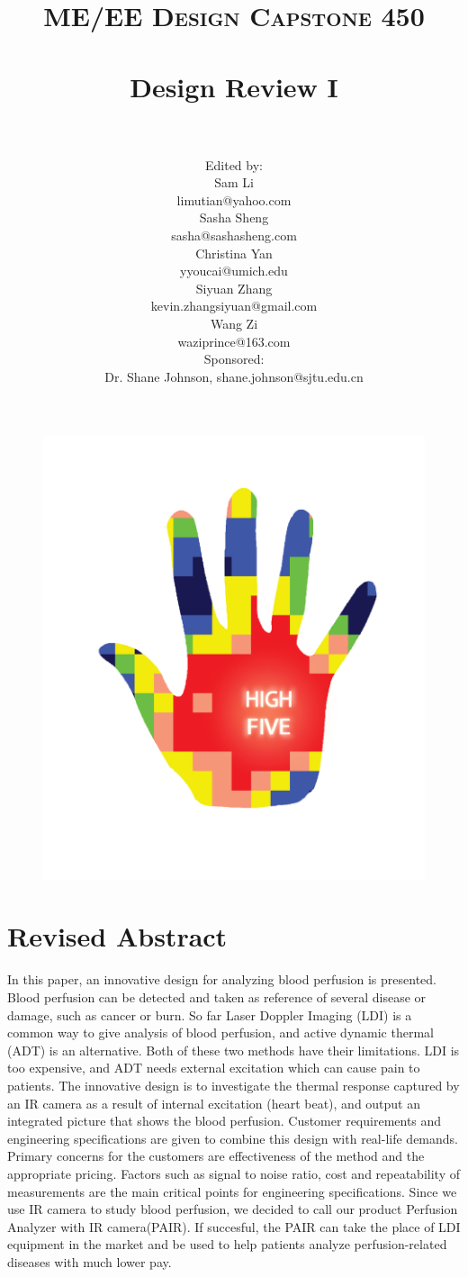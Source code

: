 \documentclass[paper=letter, fontsize=11pt]{scrartcl}
\title{
		\vspace{-1in} 	
		\usefont{OT1}{bch}{b}{n}
		\normalfont \normalsize \textsc{ME/EE Design Capstone 450} \\ [25pt]
		\horrule{0.5pt} \\[0.4cm]
		\huge Design Review I \\
		\horrule{2pt} \\[0.5cm]
}
\author{
        \normalfont 							
        \normalsize
        Edited by: \\
        Sam Li \\ limutian@yahoo.com \\[2pt]
        Sasha Sheng \\ sasha@sashasheng.com\\[2pt]
        Christina Yan \\ yyoucai@umich.edu\\[2pt]
        Siyuan Zhang\\ kevin.zhangsiyuan@gmail.com\\[2pt]
        Wang Zi \\ waziprince@163.com\\ [2pt]
         Sponsored: \\ Dr. Shane Johnson,  shane.johnson@sjtu.edu.cn\\ \vspace{0.5cm}
}
\numberwithin{equation}{section}		%
\numberwithin{figure}{section}			%
\numberwithin{table}{section}			%
\begin{document}
\maketitle
\begin{figure}[H]
    \centering
    \includegraphics[scale=0.7]{LOGO.png}
\end{figure}
\pagebreak
\tableofcontents
\pagebreak
	
\section{Revised Abstract}	
In this paper, an innovative design for analyzing blood perfusion is presented. Blood perfusion can be detected and
taken as reference of several disease or damage, such as cancer or burn. So far Laser Doppler Imaging (LDI) is a 
common way to give analysis of blood perfusion, and active dynamic thermal (ADT) is an alternative. Both of 
these two methods have their 
limitations. LDI is too expensive, and ADT needs external excitation which can cause pain to patients. The innovative design is to 
investigate the thermal response captured by an IR camera as a result of internal excitation (heart beat), and output an 
integrated picture that shows the blood perfusion. Customer requirements and engineering 
specifications are given to combine this design with real-life demands. Primary concerns for the customers are effectiveness
of the method and the appropriate pricing. Factors such as signal to noise ratio, cost and repeatability of measurements are the
main critical points for engineering specifications. Since we use IR camera to study blood perfusion, we decided to call our product 
Perfusion Analyzer with IR camera(PAIR). If succesful, the PAIR can take the place of LDI equipment in the market and be used to
help patients analyze perfusion-related diseases with much lower pay.
\end{document}
